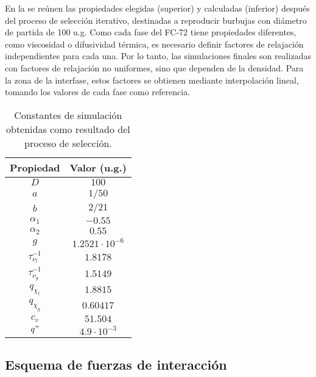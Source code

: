 En la  se re\'unen las propiedades elegidas (superior) y calculadas (inferior) despu\'es del proceso de selecci\'on iterativo, destinadas a reproducir burbujas con di\'ametro de partida de 100 u.g. Como cada fase del FC-72 tiene propiedades diferentes, como viscosidad o difusividad t\'ermica, es necesario definir factores de relajaci\'on independientes para cada una. Por lo tanto, las simulaciones finales son realizadas con factores de relajaci\'on no uniformes, sino que dependen de la densidad. Para la zona de la interfase, estos factores se obtienen mediante interpolaci\'on lineal, tomando los valores de cada fase como referencia.

\begin{table}[ht]
	\centering
    \begin{tabular}{c c}
	    \toprule
        \bf Propiedad & \bf Valor (u.g.)\\
        \midrule
        $D$ & $100$ \\
        $a$ & $1/50$ \\
        $b$ & $2/21$ \\
        $\alpha_1$ & $-0.55$ \\
        $\alpha_2$ & $0.55$ \\
        \midrule
		$g$ & $1.2521 \cdot 10^{-6}$\\
		$\tau_{\nu_l}^{-1}$ & $1.8178$\\
		$\tau_{\nu_g}^{-1}$ & $1.5149$ \\
		$q_{\chi_l}$ & $1.8815$ \\
		$q_{\chi_g}$ & $0.60417$ \\
		$c_v$ & $51.504$ \\
		$q"$ & $4.9 \cdot 10^{-3}$ \\
        \bottomrule
	\end{tabular}
	\caption{Constantes de simulaci\'on obtenidas como resultado del proceso de selecci\'on.}
	\label{tab:param_hutter_3D}
\end{table} 
\FloatBarrier



\subsection{Esquema de fuerzas de interacci\'on}

